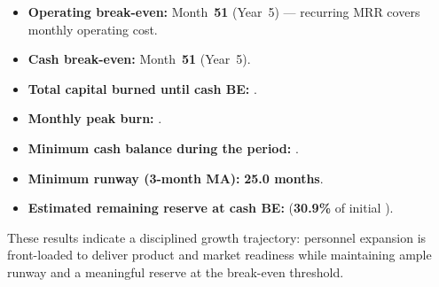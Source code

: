 \documentclass[11pt, a4paper, oneside]{article}
\begin{document}
\begin{itemize}
  \item \textbf{Operating break-even:} Month~\textbf{51} (Year~5) --- recurring MRR covers monthly operating cost.
  \item \textbf{Cash break-even:} Month~\textbf{51} (Year~5).
  \item \textbf{Total capital burned until cash BE:} \textbf{}.
  \item \textbf{Monthly peak burn:} \textbf{}.
  \item \textbf{Minimum cash balance during the period:} \textbf{}.
  \item \textbf{Minimum runway (3-month MA):} \textbf{25.0 months}.
  \item \textbf{Estimated remaining reserve at cash BE:} \textbf{} (\textbf{30.9\%} of initial ).
\end{itemize}

These results indicate a disciplined growth trajectory: personnel expansion is front-loaded to deliver product and market readiness while maintaining ample runway and a meaningful reserve at the break-even threshold.\newline\newline

\begingroup
{}
\scriptsize
\setlength{\tabcolsep}{3pt}      %
\renewcommand{\arraystretch}{1.05}
\setlength{\LTleft}{0pt}
\setlength{\LTright}{0pt}
\end{document}
